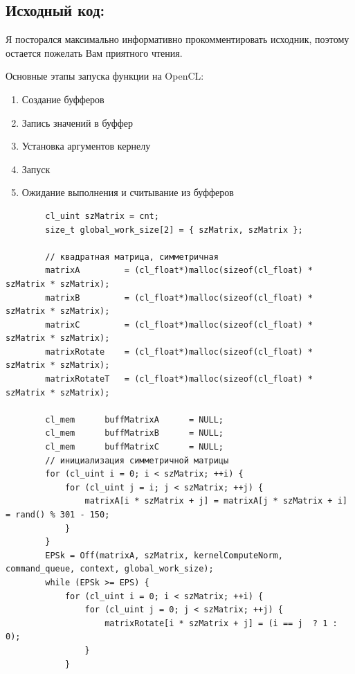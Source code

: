 \documentclass[utf8, 12pt, a4paper, oneside]{article}
\begin{document}
\subsection*{Исходный код:}
Я посторался максимально информативно прокомментировать исходник, поэтому остается пожелать Вам приятного чтения.

Основные этапы запуска функции на OpenCL:
\begin{enumerate}
\item Создание буфферов
\item Запись значений в буффер
\item Установка аргументов кернелу
\item Запуск
\item Ожидание выполнения и считывание из буфферов
\end{enumerate}
\begin{lstlisting}
        cl_uint szMatrix = cnt;
        size_t global_work_size[2] = { szMatrix, szMatrix };

        // квадратная матрица, симметричная
        matrixA         = (cl_float*)malloc(sizeof(cl_float) * szMatrix * szMatrix);
        matrixB         = (cl_float*)malloc(sizeof(cl_float) * szMatrix * szMatrix);
        matrixC         = (cl_float*)malloc(sizeof(cl_float) * szMatrix * szMatrix);
        matrixRotate    = (cl_float*)malloc(sizeof(cl_float) * szMatrix * szMatrix);
        matrixRotateT   = (cl_float*)malloc(sizeof(cl_float) * szMatrix * szMatrix);        

        cl_mem      buffMatrixA      = NULL;
        cl_mem      buffMatrixB      = NULL;
        cl_mem      buffMatrixC      = NULL;
		// инициализация симметричной матрицы
        for (cl_uint i = 0; i < szMatrix; ++i) {
            for (cl_uint j = i; j < szMatrix; ++j) {
                matrixA[i * szMatrix + j] = matrixA[j * szMatrix + i] = rand() % 301 - 150;
            }
        }        
        EPSk = Off(matrixA, szMatrix, kernelComputeNorm, command_queue, context, global_work_size);
        while (EPSk >= EPS) {
            for (cl_uint i = 0; i < szMatrix; ++i) {
                for (cl_uint j = 0; j < szMatrix; ++j) {
                    matrixRotate[i * szMatrix + j] = (i == j  ? 1 : 0);
                }
            }


\end{lstlisting}
\end{document}
